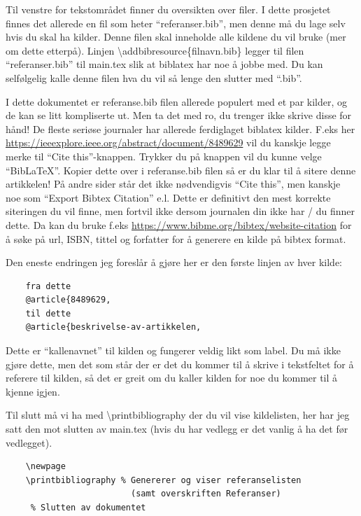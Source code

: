         Til venstre for tekstområdet finner du oversikten over filer. I dette prosjetet finnes det allerede en fil som heter ``referanser.bib'', men denne må du lage selv hvis du skal ha kilder. Denne filen skal inneholde alle kildene du vil bruke (mer om dette etterpå).
        Linjen \textbackslash addbibresource\{filnavn.bib\} legger til filen ``referanser.bib'' til main.tex slik at biblatex har noe å jobbe med. Du kan selfølgelig kalle denne filen hva du vil så lenge den slutter med ``.bib''.
        
        I dette dokumentet er referanse.bib filen allerede populert med et par kilder, og de kan se litt kompliserte ut. Men ta det med ro, du trenger ikke skrive disse for hånd! De fleste seriøse journaler har allerede ferdiglaget biblatex kilder. F.eks her \url{https://ieeexplore.ieee.org/abstract/document/8489629} vil du kanskje legge merke til ``Cite this''-knappen. Trykker du på knappen vil du kunne velge ``BibLaTeX''. Kopier dette over i referanse.bib filen så er du klar til å sitere denne artikkelen! På andre sider står det ikke nødvendigvis ``Cite this'', men kanskje noe som ``Export Bibtex Citation'' e.l. Dette er definitivt den mest korrekte siteringen du vil finne, men fortvil ikke dersom journalen din ikke har / du finner dette. Da kan du bruke f.eks \url{https://www.bibme.org/bibtex/website-citation} for å søke på url, ISBN, tittel og forfatter for å generere en kilde på bibtex format. 
        
        Den eneste endringen jeg foreslår å gjøre her er den første linjen av hver kilde:
        \begin{verbatim}
    fra dette
    @article{8489629,
    til dette
    @article{beskrivelse-av-artikkelen,
        \end{verbatim}
        
        Dette er ``kallenavnet'' til kilden og fungerer veldig likt som label. Du må ikke gjøre dette, men det som står der er det du kommer til å skrive i tekstfeltet for å referere til kilden, så det er greit om du kaller kilden for noe du kommer til å kjenne igjen.
        
        Til slutt må vi ha med \textbackslash printbibliography der du vil vise kildelisten, her har jeg satt den mot slutten av main.tex (hvis du har vedlegg er det vanlig å ha det før vedlegget).
        
        \begin{verbatim}
    \newpage
    \printbibliography % Genererer og viser referanselisten 
                         (samt overskriften Referanser)
     % Slutten av dokumentet
        \end{verbatim}
        
